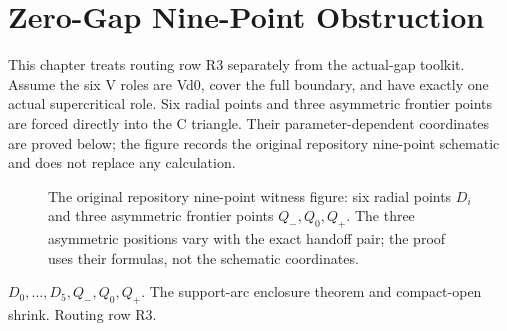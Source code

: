 \section{Zero-Gap Nine-Point Obstruction}
\label{sec:zero-gap-nine-point}

This chapter treats routing row R3 separately from the actual-gap toolkit.
Assume the six V roles are Vd0, cover the full boundary, and have exactly one
actual supercritical role.  Six radial points and three asymmetric frontier
points are forced directly into the C triangle.  Their parameter-dependent
coordinates are proved below; the figure records the original repository
nine-point schematic and does not replace any calculation.

\begin{figure}[H]
\centering
\resizebox{.88\linewidth}{!}{}
\caption{The original repository nine-point witness figure: six radial
points $D_i$ and three asymmetric frontier points $Q_-,Q_0,Q_+$.  The three
asymmetric positions vary with the exact handoff pair; the proof uses their
formulas, not the schematic coordinates.}
\label{fig:readable-original-nine-point}
\end{figure}

{$D_0,\ldots,D_5,Q_-,Q_0,Q_+$.}
{The support-arc enclosure theorem and compact-open shrink.}
{Routing row R3.}



